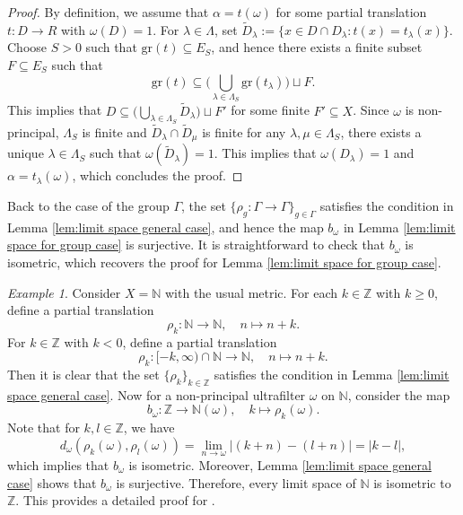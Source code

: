 \documentclass[12pt, a4paper]{amsart}
\numberwithin{equation}{section}
\theoremstyle{definition}
\theoremstyle{remark}
\newtheorem{ex}[thm]{Example}
\def\NN{\mathbb{N}}
\def\ZZ{\mathbb{Z}}
\def\gr{\mathrm{gr}}
\begin{document}
\begin{proof}
By definition, we assume that $\alpha = t(\omega)$ for some partial translation $t: D \to R$ with $\omega(D)=1$. For $\lambda \in \Lambda$, set $\widetilde{D}_\lambda:=\{x\in D \cap D_\lambda: t(x) = t_\lambda(x)\}$. Choose $S>0$ such that $\gr(t) \subseteq E_S$, and hence there exists a finite subset $F \subseteq E_S$ such that
\[
\gr(t) \subseteq \big( \bigcup_{\lambda \in \Lambda_S} \gr(t_\lambda) \big) \sqcup F.
\]
This implies that $D \subseteq \big( \bigcup_{\lambda \in \Lambda_S} \widetilde{D}_\lambda \big) \sqcup F'$ for some finite $F' \subseteq X$. Since $\omega$ is non-principal, $\Lambda_S$ is finite and $\widetilde{D}_\lambda \cap \widetilde{D}_\mu$ is finite for any $\lambda, \mu \in \Lambda_S$, there exists a unique $\lambda \in \Lambda_S$ such that $\omega(\widetilde{D}_\lambda)=1$. This implies that $\omega(D_\lambda)=1$ and $\alpha = t_\lambda(\omega)$, which concludes the proof.
\end{proof}

Back to the case of the group $\Gamma$, the set $\{\rho_g: \Gamma \to \Gamma\}_{g\in \Gamma}$ satisfies the condition in Lemma \ref{lem:limit space general case}, and hence the map $b_\omega$ in Lemma \ref{lem:limit space for group case} is surjective. It is straightforward to check that $b_\omega$ is isometric, which recovers the proof for Lemma \ref{lem:limit space for group case}.


\begin{ex}\label{eg:limit spaces for N}
Consider $X=\NN$ with the usual metric. For each $k \in \ZZ$ with $k \geq 0$, define a partial translation
\[
\rho_k: \NN \longrightarrow \NN, \quad n \mapsto n+k.
\]
For $k\in \ZZ$ with $k<0$, define a partial translation
\[
\rho_k: [-k, \infty) \cap \NN \longrightarrow \NN, \quad n \mapsto n+k.
\]
Then it is clear that the set $\{\rho_k\}_{k\in \ZZ}$ satisfies the condition in Lemma \ref{lem:limit space general case}. Now for a non-principal ultrafilter $\omega$ on $\NN$, consider the map 
\[
b_\omega: \ZZ \longrightarrow \NN(\omega), \quad k \mapsto \rho_k(\omega).
\]
Note that for $k,l\in \ZZ$, we have
\[
d_\omega(\rho_k(\omega), \rho_l(\omega)) = \lim_{n\to \omega} |(k+n) - (l+n)| = |k-l|,
\]
which implies that $b_\omega$ is isometric. Moreover, Lemma \ref{lem:limit space general case} shows that $b_\omega$ is surjective. Therefore, every limit space of $\NN$ is isometric to $\ZZ$. This provides a detailed proof for \cite[Example 3.14(2)]{SW17}.
\end{ex}
\end{document}
